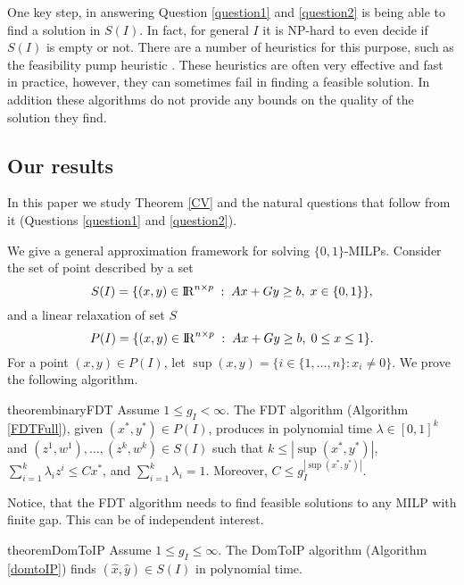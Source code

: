 \documentclass[runningheads]{llncs}
\begin{document}
One key step, in answering Question \ref{question1} and \ref{question2} is being able to find a solution in $S(I)$. In fact, for general $I$ it is NP-hard to even decide if $S(I)$ is empty or not. There are a number of heuristics for this purpose, such as the feasibility pump heuristic \cite{fp1,fp2}. These heuristics are often very effective and fast in practice, however, they can sometimes fail in finding a feasible solution. In addition these algorithms do not provide any bounds on the quality of the solution they find.










\subsection{Our results}

In this paper we study Theorem \ref{CV} and the natural questions that follow from it (Questions \ref{question1} and \ref{question2}).


We give a general approximation framework for solving $\{0,1\}$-MILPs.  Consider the set of point described by a set 
\begin{equation}
S(I)= \{(x,y)\in {\rm I\!R}^{n\times p}\;:\; Ax+Gy\geq b,\; x\in \{0,1\}\},  \label{S'}
\end{equation}
and a linear relaxation of set $S$
\begin{equation}
P(I) = \{(x,y)\in {\rm I\!R}^{n\times p}\;:\; Ax+Gy\geq b,\; 0 \leq x\leq 1\}. \label{P'}
\end{equation}
For a point $(x,y)\in P(I)$, let $\sup(x,y)= \{i \in \{1,\ldots,n\}: x_i \neq 0\}$.  We prove the following algorithm.

\begin{restatable}{theorem}{binaryFDT}
	\label{binaryFDT}
	Assume $1\leq g_I<\infty$. 	
	The FDT algorithm (Algorithm \ref{FDTFull}), given $(x^*,y^*)\in P(I)$, produces in polynomial time $\lambda\in [0,1]^k$ and $(z^1,w^1),\ldots,(z^k,w^k) \in S(I)$ such that $k\leq |\sup(x^*,y^*)|$, $\sum_{i=1}^{k}\lambda_i z^i\leq Cx^*$, and $\sum_{i=1}^{k}\lambda_i = 1$. Moreover, $C\leq g_I^{|\sup(x^*,y^*)|}$.
\end{restatable}

Notice, that the FDT algorithm needs to find feasible solutions to any MILP with finite gap. This can be of independent interest.
\begin{restatable}{theorem}{DomToIP}
	\label{DomToIP}
	Assume $1\leq g_I \leq \infty$. The DomToIP algorithm (Algorithm \ref{domtoIP}) finds $(\hat{x},\hat{y})\in S(I)$ in polynomial time.
\end{restatable}
\end{document}

